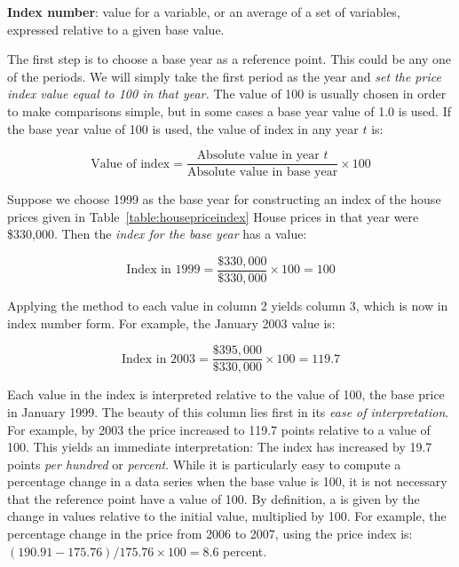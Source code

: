 \begin{DefBox}
\textbf{Index number}: value for a variable, or an average of a set of variables, expressed relative to a given base value.
\end{DefBox}

The first step is to choose a base year as a reference point. This could be any one of the periods. We will simply take the first period as the year and \textit{set the price index value equal to 100 in that year.} The value of 100 is usually chosen in order to make comparisons simple, but in some cases a base year value of 1.0 is used. If the base year value of 100 is used, the value of index in any year $t$ is:

\begin{equation} \label{eq:valueofindex}
\text{Value of index}=\frac{\text{Absolute value in year }t}{\text{Absolute value in base year}}\times 100
\end{equation}

Suppose we choose 1999 as the base year for constructing an index of the house prices given in Table~\ref{table:housepriceindex} House prices in that year were \$330,000. Then the \textit{index for the base year} has a value:

\begin{equation*}
\text{Index in 1999}=\frac{\$330,000}{\$330,000}\times 100=100
\end{equation*}

Applying the method to each value in column 2 yields column 3, which is now in index number form. For example, the January 2003 value is:

\begin{equation*}
\text{Index in 2003}=\frac{\$395,000}{\$330,000}\times 100=119.7
\end{equation*}

Each value in the index is interpreted relative to the value of 100, the base price in January 1999. The beauty of this column lies first in its \textit{ease of interpretation}. For example, by 2003 the price increased to 119.7 points relative to a value of 100. This yields an immediate interpretation: The index has increased by 19.7 points \textit{per hundred} or \textit{percent}. While it is particularly easy to compute a percentage change in a data series when the base value is 100, it is not necessary that the reference point have a value of 100. By definition, a  is given by the change in values relative to the initial value, multiplied by 100. For example, the percentage change in the price from 2006 to 2007, using the price index is: $(190.91-175.76)/175.76\times 100=8.6$ percent.

